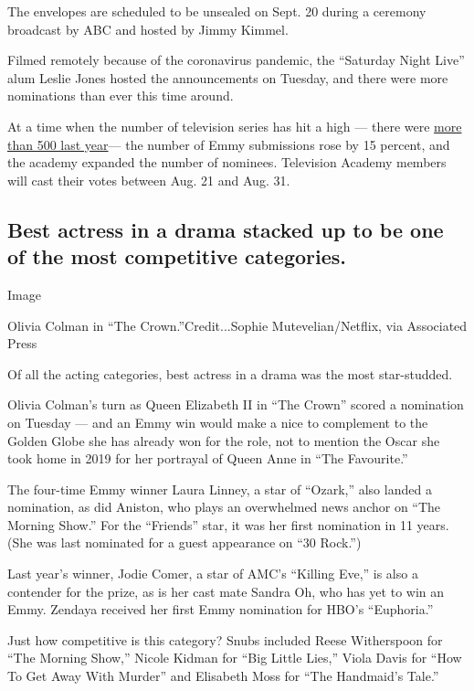 The envelopes are scheduled to be unsealed on Sept. 20 during a ceremony
broadcast by ABC and hosted by Jimmy Kimmel.

Filmed remotely because of the coronavirus pandemic, the ``Saturday
Night Live'' alum Leslie Jones hosted the announcements on Tuesday, and
there were more nominations than ever this time around.

At a time when the number of television series has hit a high --- there
were
\href{https://www.nytimes.com/2020/01/09/business/media/tv-shows-2020.html}{more
than 500 last year}--- the number of Emmy submissions rose by 15
percent, and the academy expanded the number of nominees. Television
Academy members will cast their votes between Aug. 21 and Aug. 31.

\hypertarget{best-actress-in-a-drama-stacked-up-to-be-one-of-the-most-competitive-categories}{%
\subsection{Best actress in a drama stacked up to be one of the most
competitive
categories.}\label{best-actress-in-a-drama-stacked-up-to-be-one-of-the-most-competitive-categories}}

Image

Olivia Colman in ``The Crown.''Credit...Sophie Mutevelian/Netflix, via
Associated Press

Of all the acting categories, best actress in a drama was the most
star-studded.

Olivia Colman's turn as Queen Elizabeth II in ``The Crown'' scored a
nomination on Tuesday --- and an Emmy win would make a nice to
complement to the Golden Globe she has already won for the role, not to
mention the Oscar she took home in 2019 for her portrayal of Queen Anne
in ``The Favourite.''

The four-time Emmy winner Laura Linney, a star of ``Ozark,'' also landed
a nomination, as did Aniston, who plays an overwhelmed news anchor on
``The Morning Show.'' For the ``Friends'' star, it was her first
nomination in 11 years. (She was last nominated for a guest appearance
on ``30 Rock.'')

Last year's winner, Jodie Comer, a star of AMC's ``Killing Eve,'' is
also a contender for the prize, as is her cast mate Sandra Oh, who has
yet to win an Emmy. Zendaya received her first Emmy nomination for HBO's
``Euphoria.''

Just how competitive is this category? Snubs included Reese Witherspoon
for ``The Morning Show,'' Nicole Kidman for ``Big Little Lies,'' Viola
Davis for ``How To Get Away With Murder'' and Elisabeth Moss for ``The
Handmaid's Tale.''

